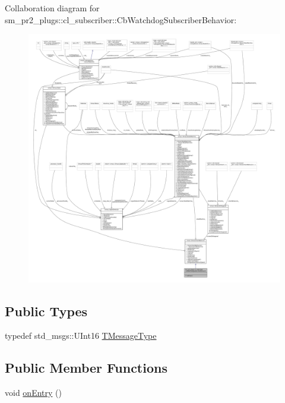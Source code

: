 Collaboration diagram for sm\+\_\+pr2\+\_\+plugs\+:\+:cl\+\_\+subscriber\+:\+:Cb\+Watchdog\+Subscriber\+Behavior\+:
\nopagebreak
\begin{figure}[H]
\begin{center}
\leavevmode
\includegraphics[width=350pt]{classsm__pr2__plugs_1_1cl__subscriber_1_1CbWatchdogSubscriberBehavior__coll__graph}
\end{center}
\end{figure}
\subsection*{Public Types}
\begin{DoxyCompactItemize}
\item 
typedef std\+\_\+msgs\+::\+U\+Int16 \hyperlink{classsm__pr2__plugs_1_1cl__subscriber_1_1CbWatchdogSubscriberBehavior_ac71fd79d4c0fab96dbef1740d0e415a5}{T\+Message\+Type}
\end{DoxyCompactItemize}
\subsection*{Public Member Functions}
\begin{DoxyCompactItemize}
\item 
void \hyperlink{classsm__pr2__plugs_1_1cl__subscriber_1_1CbWatchdogSubscriberBehavior_a15796d4cae539489a23fc0e444074158}{on\+Entry} ()
\end{DoxyCompactItemize}


